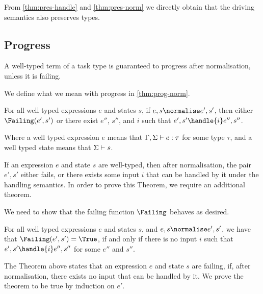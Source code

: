 From \cref{thm:pres-handle} and \cref{thm:pres-norm} we directly
obtain that the driving semantics also preserves types.

\subsection{Progress}

A well-typed term of a task type is guaranteed to progress after normalisation,
unless it is failing.

We define what we mean with progress in \cref{thm:prog-norm}.
\begin{theorem}
  For all well typed expressions $e$ and states $s$,
  if $e,s \normalise e',s'$,
  then either $\Failing(e', s')$
  or there exist $e''$, $s''$, and $i$ such that $e',s'\handle{i} e'',s''$.
  \label{thm:prog-norm}
\end{theorem}

Where a well typed expression $e$ means that $\Gamma,\Sigma\vdash e:\tau$ for
some type $\tau$, and a well typed state means that $\Sigma\vdash s$.

If an expression $e$ and state $s$ are well-typed, then after normalisation, the pair $e',s'$
either fails, or there exists some input $i$ that can be handled by it under the handling semantics.
In order to prove this Theorem, we require an additional theorem.


We need to show that the failing function $\Failing$ behaves as desired.

\begin{theorem}
  For all well typed expressions $e$ and states $s$,
  and $e,s \normalise e',s'$,
  we have that $\Failing(e',s') = \True$,
  if and only if there is no input $i$
  such that $e',s'\handle{i} e'',s''$ for some $e''$ and $s''$.
  \label{thm:failing}
\end{theorem}

The Theorem above states that an expression $e$ and state $s$ are failing, if,
after normalisation, there exists no input that can be handled by it.
We prove the theorem to be true by induction on $e'$.

